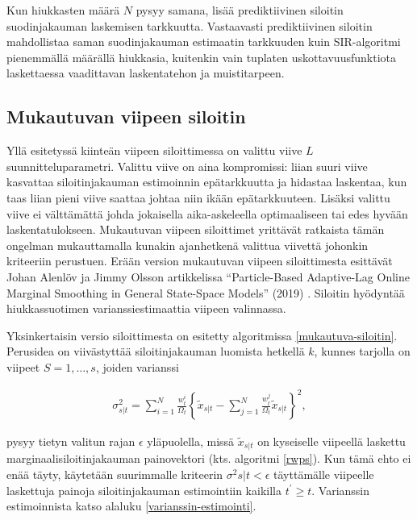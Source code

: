 \documentclass[
  12pt,
  a4paper, twoside]{book}
\begin{document}
Kun hiukkasten määrä \(N\) pysyy samana, lisää prediktiivinen siloitin suodinjakauman laskemisen tarkkuutta. Vastaavasti prediktiivinen siloitin mahdollistaa saman suodinjakauman estimaatin tarkkuuden kuin SIR-algoritmi pienemmällä määrällä hiukkasia, kuitenkin vain tuplaten uskottavuusfunktiota laskettaessa vaadittavan laskentatehon ja muistitarpeen.

\subsection{Mukautuvan viipeen siloitin}

Yllä esitetyssä kiinteän viipeen siloittimessa on valittu viive \(L\) suunnitteluparametri. Valittu viive on aina kompromissi: liian suuri viive kasvattaa siloitinjakauman estimoinnin epätarkkuutta ja hidastaa laskentaa, kun taas liian pieni viive saattaa johtaa niin ikään epätarkkuuteen. Lisäksi valittu viive ei välttämättä johda jokaisella aika-askeleella optimaaliseen tai edes hyvään laskentatulokseen. Mukautuvan viipeen siloittimet yrittävät ratkaista tämän ongelman mukauttamalla kunakin ajanhetkenä valittua viivettä johonkin kriteeriin perustuen. Erään version mukautuvan viipeen siloittimesta esittävät Johan Alenlöv ja Jimmy Olsson artikkelissa ``Particle-Based Adaptive-Lag Online Marginal Smoothing in General State-Space Models'' (2019) \citep{alenlov-2019}. Siloitin hyödyntää hiukkassuotimen varianssiestimaattia viipeen valinnassa.

Yksinkertaisin versio siloittimesta on esitetty algoritmissa \ref{mukautuva-siloitin}. Perusidea on viivästyttää siloitinjakauman luomista hetkellä \(k\), kunnes tarjolla on viipeet \(S=1,\ldots,s\), joiden varianssi

\begin{align}\label{siloitin-varianssi}
\sigma^2_{s|t} = \sum_{i=1}^N \frac{w_t^i}{\Omega_t}\left\{\tilde{x}_{s|t} - \sum_{j=1}^N \frac{w_t^j}{\Omega_t}\tilde{x}_{s|t} \right\}^2,
\end{align}

pysyy tietyn valitun rajan \(\epsilon\) yläpuolella, missä \(\tilde{x}_{s|t}\) on kyseiselle viipeellä laskettu marginaalisiloitinjakauman painovektori (kts. algoritmi \ref{rwps}). Kun tämä ehto ei enää täyty, käytetään suurimmalle kriteerin \(\sigma^2{s|t} < \epsilon\) täyttämälle viipeelle laskettuja painoja siloitinjakauman estimointiin kaikilla \(t^\prime \ge t\). Varianssin estimoinnista katso alaluku \ref{varianssin-estimointi}.
\end{document}
